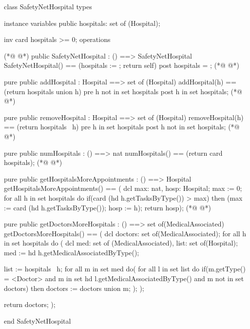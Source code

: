 \begin{vdmpp}[breaklines=true]
class SafetyNetHospital
types

instance variables
 public hospitals: set of (Hospital);
 
 inv card hospitals >= 0;
operations

(*@
\label{SafetyNetHospital:10}
@*)
 public SafetyNetHospital : () ==> SafetyNetHospital
  SafetyNetHospital() == (hospitals := {}; return self)
 post hospitals = {};
(*@
\label{addHospital:13}
@*)
  
 pure public addHospital : Hospital ==> set of (Hospital)
  addHospital(h) == (return hospitals union {h})
 pre h not in set hospitals
 post h in set hospitals;
(*@
\label{removeHospital:18}
@*)
 
 pure public removeHospital : Hospital ==> set of (Hospital)
  removeHospital(h) == (return hospitals \ {h})
 pre h in set hospitals
 post h not in set hospitals;
(*@
\label{numHospitals:23}
@*)
 
 pure public numHospitals : () ==> nat
  numHospitals() == (return card hospitals);
(*@
\label{getHospitalsMoreAppointments:26}
@*)
  
 pure public getHospitalsMoreAppointments : () ==> Hospital
  getHospitalsMoreAppointments() == (
                    dcl max: nat, hosp: Hospital;
                    max := 0;
                    for all h in set hospitals do
                     if(card (hd h.getTasksByType()) > max)
                      then (max := card (hd h.getTasksByType()); hosp := h);
                    return hosp);
(*@
\label{getDoctorsMoreHospitals:35}
@*)
 
 pure public getDoctorsMoreHospitals : () ==> set of(MedicalAssociated)
  getDoctorsMoreHospitals() == (
                  dcl doctors: set of(MedicalAssociated);
                  for all h in set hospitals do (
                   dcl med: set of (MedicalAssociated), list: set of(Hospital);
                   med := hd h.getMedicalAssociatedByType();
                   
                   list := hospitals \ {h};
                   for all m in set med do(
                    for all l in set list do
                     if(m.getType() = <Doctor> and m in set hd l.getMedicalAssociatedByType() and m not in set doctors)
                      then doctors := doctors union {m};
                   );
                  );
                  
                  return doctors;
                 );              
  
end SafetyNetHospital
\end{vdmpp}
